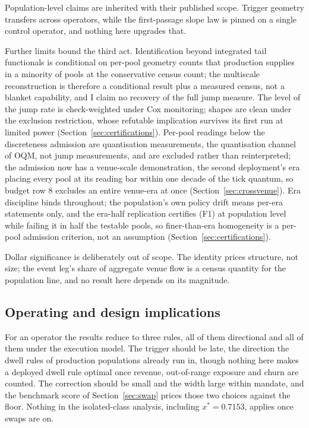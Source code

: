 \documentclass[11pt,a4paper]{article}
\theoremstyle{definition}
\theoremstyle{plain}
\theoremstyle{remark}
\begin{document}
Population-level claims are inherited with their published scope. Trigger geometry transfers across operators, while the first-passage slope law is pinned on a single control operator, and 
nothing here upgrades that.

Further limits bound the third act. Identification beyond integrated tail functionals is conditional on per-pool geometry counts that production supplies in a minority of pools at the 
conservative census count; the multiscale reconstruction is therefore a conditional result plus a measured census, not a blanket capability, and I claim no recovery of the full jump measure. 
The level of the jump rate is check-weighted under Cox monitoring; shapes are clean under the exclusion restriction, whose refutable implication survives its first run at limited 
power (Section~\ref{sec:certifications}). Per-pool readings below the discreteness admission are quantisation measurements, the quantisation channel of OQM, not jump measurements, 
and are excluded rather than reinterpreted; the admission now has a venue-scale demonstration, the second deployment's era placing every pool at its reading bar within one decade of 
the tick quantum, so budget row 8 excludes an entire venue-era at once (Section~\ref{sec:crossvenue}). Era discipline binds throughout; the population's own policy drift means per-era 
statements only, and the era-half replication certifies (F1) at population level while failing it in half the testable pools, so finer-than-era homogeneity is a per-pool admission 
criterion, not an assumption (Section~\ref{sec:certifications}).

Dollar significance is deliberately out of scope. The identity prices structure, not size; the event leg's share of aggregate venue flow is a census quantity for the population line, 
and no result here depends on its magnitude.

\subsection{Operating and design implications}\label{sec:implications}

For an operator the results reduce to three rules, all of them directional and all of them under the execution model. The trigger should be late, the direction the dwell rules of production 
populations already run in, though nothing here makes a deployed dwell rule optimal once revenue, out-of-range exposure and churn are counted. The correction should be small and the width 
large within mandate, and the benchmark score of Section~\ref{sec:swap} prices those two choices against the floor. Nothing in the isolated-class analysis, including $x^* = 0.7153$, applies 
once swaps are on.
\end{document}
